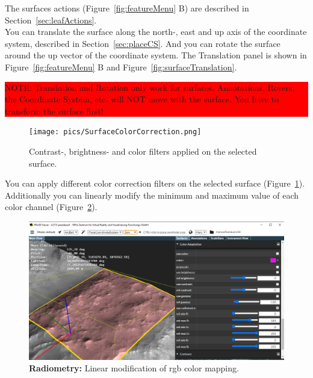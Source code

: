 The surfaces actions (Figure~\ref{fig:featureMenu} B) are described in Section~\ref{sec:leafActions}. \\


You can translate the surface along the north-, east and up axis of the coordinate system, described in Section~\ref{sec:placeCS}. And you can rotate the surface around the up vector of the coordinate system. The Translation panel is shown in Figure~\ref{fig:featureMenu} B and Figure~\ref{fig:surfaceTranslation}. \\

\begin{center}
\colorbox{red}{\parbox{1.0\textwidth}{NOTE: Translation and Rotation only work for surfaces. Annotations, Rovers, the Coordinate System, etc. will NOT move with the surface. You have to transform the surface first!}}
\end{center}

\begin{figure}[h]
    	\centering
    		\texttt{[image: pics/SurfaceColorCorrection.png]}
    	\caption[Surface Color Correction]{Contrast-, brightness- and color filters applied on the selected surface.}
    	\label{fig:surfaceColorCorrection}
   \end{figure}

You can apply different color correction filters on the selected surface	(Figure~\ref{fig:surfaceColorCorrection}). 
Additionally you can linearly modify the minimum and maximum value of each color channel (Figure~\ref{fig:surfaceRadiometry}).\\

\begin{figure}[h]
    	\centering
    		\includegraphics[width=1\textwidth]{pics/radiometry.png}
    	\caption[Surface Radiometry]{\textbf{Radiometry:} Linear modification of rgb color mapping.}
    	\label{fig:surfaceRadiometry}
   \end{figure}

